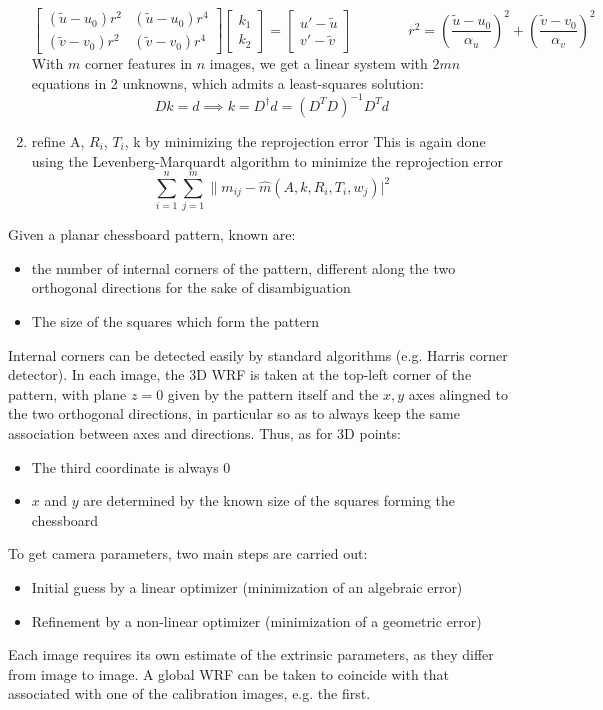 \documentclass{article}
\begin{document}
\begin{enumerate}
\[\begin{bmatrix}
            (\tilde u - u_0) r^2 & (\tilde u - u_0) r^4 \\
            (\tilde v - v_0) r^2 & (\tilde v - v_0) r^4
        \end{bmatrix} \begin{bmatrix}
            k_1 \\ k_2 
        \end{bmatrix} = \begin{bmatrix}
            u' - \tilde u \\
            v' - \tilde v
        \end{bmatrix} \qquad \qquad r^2 = \left(\displaystyle\frac{\tilde u - u_0}{\alpha_u}\right)^2 + \left(\displaystyle\frac{\tilde v - v_0}{\alpha_v}\right)^2
    \]
    With $m$ corner features in $n$ images, we get a linear system with $2mn$ equations in 2 unknowns, which admits a least-squares solution:
    \[
        Dk =d \implies k = D^\dagger d = (D^TD)^{-1}D^Td
    \]
    \item refine A, $R_i$, $T_i$, k by minimizing the reprojection error
        This is again done using the Levenberg-Marquardt algorithm to minimize the reprojection error
        \[
            \displaystyle\sum_{i=1}^{n} \displaystyle\sum_{j=1}^{m} \|m_{ij} - \hat{m}(A,k,R_i,T_i,w_j)|^2
        \]
\end{enumerate}

Given a planar chessboard pattern, known are:
\begin{itemize}
    \item the number of internal corners of the pattern, different along the two orthogonal directions for the sake of disambiguation
    \item The size of the squares which form the pattern
\end{itemize}
Internal corners can be detected easily by standard algorithms (e.g. Harris corner detector). In each image, the 3D WRF is taken at the top-left corner of the pattern, with plane $z=0$ given by the pattern itself and the $x,y$ axes alingned to the two orthogonal directions, in particular so as to always keep the same association between axes and directions. Thus, as for 3D points:
\begin{itemize}
    \item The third coordinate is always 0 
    \item $x$ and $y$ are determined by the known size of the squares forming the chessboard 
\end{itemize}
To get camera parameters, two main steps are carried out: 
\begin{itemize}
    \item Initial guess by a linear optimizer (minimization of an algebraic error) 
    \item Refinement by a non-linear optimizer (minimization of a geometric error)
\end{itemize}
Each image requires its own estimate of the extrinsic parameters, as they differ from image to image. A global WRF can be taken to coincide with that associated with one of the calibration images, e.g. the first.
\end{document}
